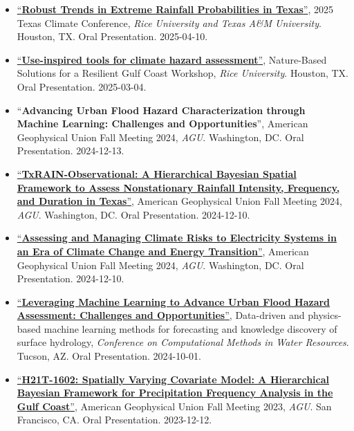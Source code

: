 \documentclass[10pt,oneside]{article}
\begin{document}
\begin{itemize}[label={}]
  
  \item \href{https://si.rice.edu/texas-climate-conference-2025}{\enquote{\textbf{Robust Trends in Extreme Rainfall Probabilities in Texas}}}, 2025 Texas Climate Conference,  \textit{Rice University and Texas A\&M University}. Houston, TX. Oral Presentation. 2025-04-10.
  
  \item \href{https://events.rice.edu/event/nbs-workshop#!view/all}{\enquote{\textbf{Use-inspired tools for climate hazard assessment}}}, Nature-Based Solutions for a Resilient Gulf Coast Workshop,  \textit{Rice University}. Houston, TX. Oral Presentation. 2025-03-04.
  
  \item \enquote{\textbf{Advancing Urban Flood Hazard Characterization through Machine Learning: Challenges and Opportunities}}, American Geophysical Union Fall Meeting 2024,  \textit{AGU}. Washington, DC. Oral Presentation. 2024-12-13.
  
  \item \href{https://agu.confex.com/agu/agu24/meetingapp.cgi/Paper/1624973}{\enquote{\textbf{TxRAIN-Observational: A Hierarchical Bayesian Spatial Framework to Assess Nonstationary Rainfall Intensity, Frequency, and Duration in Texas}}}, American Geophysical Union Fall Meeting 2024,  \textit{AGU}. Washington, DC. Oral Presentation. 2024-12-10.
  
  \item \href{https://agu.confex.com/agu/agu24/meetingapp.cgi/Paper/1711820}{\enquote{\textbf{Assessing and Managing Climate Risks to Electricity Systems in an Era of Climate Change and Energy Transition}}}, American Geophysical Union Fall Meeting 2024,  \textit{AGU}. Washington, DC. Oral Presentation. 2024-12-10.
  
  \item \href{https://cmwrconference.org/wp-content/uploads/2024/09/CMWR-2024-Agenda-Full.pdf}{\enquote{\textbf{Leveraging Machine Learning to Advance Urban Flood Hazard Assessment: Challenges and Opportunities}}}, Data-driven and physics-based machine learning methods for forecasting and knowledge discovery of surface hydrology,  \textit{Conference on Computational Methods in Water Resources}. Tucson, AZ. Oral Presentation. 2024-10-01.
  
  \item \href{https://agu.confex.com/agu/fm23/meetingapp.cgi/Paper/1328932}{\enquote{\textbf{H21T-1602: Spatially Varying Covariate Model: A Hierarchical Bayesian Framework for Precipitation Frequency Analysis in the Gulf Coast}}}, American Geophysical Union Fall Meeting 2023,  \textit{AGU}. San Francisco, CA. Oral Presentation. 2023-12-12.
  

\end{itemize}
\end{document}
